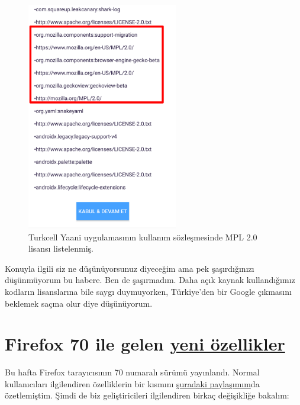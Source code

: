 \documentclass[11pt]{article}
\begin{document}
\begin{figure}[htbp]
\centering
\includegraphics[height=10cm]{gorseller/turkcell-mpl-ihlal.png}
\caption{Turkcell Yaani uygulamasının kullanım sözleşmesinde MPL 2.0 lisansı listelenmiş.}
\end{figure}

Konuyla ilgili siz ne düşünüyorsunuz diyeceğim ama pek şaşırdığınızı
düşünmüyorum bu habere. Ben de şaşırmadım. Daha açık kaynak kullandığımız
kodların lisanslarına bile saygı duymuyorken, Türkiye'den bir Google çıkmasını
beklemek saçma olur diye düşünüyorum.
\section{Firefox 70 ile gelen \href{https://hacks.mozilla.org/2019/10/firefox-70-a-bountiful-release-for-all/}{yeni özellikler}}
\label{sec:orgc0db7d0}
Bu hafta Firefox tarayıcısının 70 numaralı sürümü yayınlandı. Normal
kullanıcıları ilgilendiren özelliklerin bir kısmını \href{https://teknoseyir.com/durum/1162388}{şuradaki paylaşımım}da
özetlemiştim. Şimdi de biz geliştiricileri ilgilendiren birkaç değişikliğe
bakalım:
\end{document}
